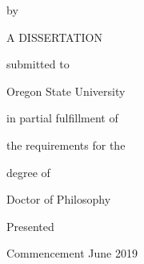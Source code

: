 \documentclass[titlepage,12pt]{article}
\begin{document}
\singlespacing
\centering

\ThesisTitle

\vspace{24pt}
\noindent
by

\noindent
\ThesisAuthor

\vspace{3cm}
\noindent
A DISSERTATION

\vspace{24pt}
\noindent

submitted to

\vspace{24pt}
\noindent

Oregon State University

\vspace{3cm}

\noindent
in partial fulfillment of

\noindent
the requirements for the

\noindent
degree of

\vspace{24pt}

\noindent
Doctor of Philosophy

\vspace{3cm}

\noindent
Presented \DefenseDate\par
\noindent
Commencement June 2019

\thispagestyle{empty}
\end{document}
